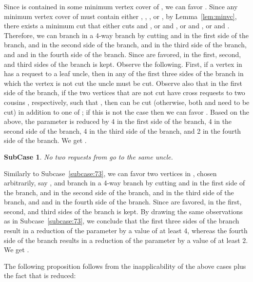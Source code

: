 \documentclass[11pt]{article}
\newtheorem{subcase}[theorem]{SubCase}
\begin{document}
Since  is contained in some minimum vertex cover of , we can favor . Since any minimum vertex cover of  must contain either , ,
, or , by Lemma~\ref{lem:minvc}, there exists a minimum cut that either cuts  and , or  and , or  and , or  and . Therefore, we can branch in a 4-way branch by cutting  and  in the first side of the branch,  and  in the second side of the branch,  and  in the third side of the branch, and  and  in the fourth side of the branch. Since  are favored, in the first, second, and third sides of the branch  is kept. Observe the following. First, if a vertex in  has a request to a leaf uncle, then in any of the first three sides of the branch in which the vertex is not cut the uncle must be cut. Observe also that in the first side of the branch, if the two vertices  that are not cut have cross requests to two cousins , respectively, such that , then  can be cut (otherwise, both  and  need to be cut) in addition to one of ; if this is not the case then we can favor . Based on the above, the parameter is reduced by 4 in the first side of the branch, 4 in the second side of the branch, 4 in the third side of the branch, and 2 in the fourth side of the branch. We get
.


\begin{subcase}
\label{subcase:74}
No two requests from  go to the same uncle.
\end{subcase}

Similarly to Subcase~\ref{subcase:73}, we can favor two vertices in , chosen arbitrarily, say , and branch in a 4-way branch by cutting  and  in the first side of the branch,  and  in the second side of the branch,  and  in the third side of the branch, and  and  in the fourth side of the branch. Since  are favored, in the first, second, and third sides of the branch  is kept. By drawing the same observations as in Subcase~\ref{subcase:73}, we conclude that the first three sides of the branch result in a reduction of the parameter by a value of at least 4, whereas the fourth side of the branch results in a reduction of the parameter by a value of at least 2. We get .


The following proposition follows from the inapplicability of the above cases plus the fact that  is reduced:
\end{document}
